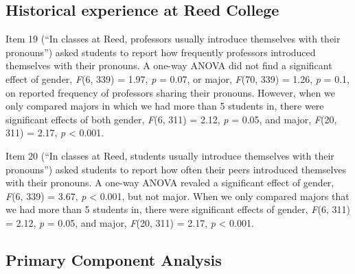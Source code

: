 \documentclass[12pt,twoside]{reedthesis}
\begin{document}
\hypertarget{historical-experience-at-reed-college}{%
\subsection{Historical experience at Reed College}\label{historical-experience-at-reed-college}}

Item 19 (``In classes at Reed, professors usually introduce themselves with their pronouns'') asked students to report how frequently professors introduced themselves with their pronouns. A one-way ANOVA did not find a significant effect of gender, \emph{F}(6, 339) = 1.97, \emph{p} = 0.07, or major, \emph{F}(70, 339) = 1.26, \emph{p} = 0.1, on reported frequency of professors sharing their pronouns. However, when we only compared majors in which we had more than 5 students in, there were significant effects of both gender, \emph{F}(6, 311) = 2.12, \emph{p} = 0.05, and major, \emph{F}(20, 311) = 2.17, \emph{p} \textless{} 0.001.

Item 20 (``In classes at Reed, students usually introduce themselves with their pronouns'') asked students to report how often their peers introduced themselves with their pronouns. A one-way ANOVA revaled a significant effect of gender, \emph{F}(6, 339) = 3.67, \emph{p} \textless{} 0.001, but not major. When we only compared majors that we had more than 5 students in, there were significant effects of gender, \emph{F}(6, 311) = 2.12, \emph{p} = 0.05, and major, \emph{F}(20, 311) = 2.17, \emph{p} \textless{} 0.001.

\hypertarget{primary-component-analysis}{%
\subsection{Primary Component Analysis}\label{primary-component-analysis}}
\end{document}
